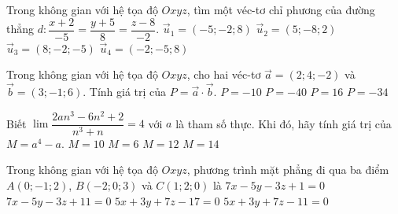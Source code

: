\begin{ex}%
	Trong không gian với hệ tọa độ $Oxyz$, tìm một véc-tơ chỉ phương của đường thẳng $d:\dfrac{x+2}{-5}=\dfrac{y+5}{8}=\dfrac{z-8}{-2}$. 
	\choice
	{$\overrightarrow{u}_1=(-5;-2;8)$}
	{\True $\overrightarrow{u}_2=(5;-8;2)$}
	{$\overrightarrow{u}_3=(8;-2;-5)$}
	{$\overrightarrow{u}_4=(-2;-5;8)$}
\end{ex}

\begin{ex}%
	Trong không gian với hệ tọa độ $Oxyz$, cho hai véc-tơ $\overrightarrow{a}=(2;4;-2)$ và $\overrightarrow{b}=(3;-1;6)$. Tính giá trị của $P=\overrightarrow{a}\cdot\overrightarrow{b}$. 
	\choice
	{\True $P=-10$}
	{$P=-40$}
	{$P=16$}
	{$P=-34$}
\end{ex}

\begin{ex}%
	Biết $\lim\dfrac{2an^3-6n^2+2}{n^3+n}=4$ với $a$ là tham số thực. Khi đó, hãy tính giá trị của $M=a^4-a$.
	\choice
	{$M=10$}
	{$M=6$}
	{$M=12$}
	{\True $M=14$}
\end{ex}

\begin{ex}%
	Trong không gian với hệ tọa độ $Oxyz$, phương trình mặt phẳng đi qua ba điểm $A(0;-1;2)$, $B(-2;0;3)$ và $C(1;2;0)$ là
	\choice
	{$7x-5y-3z+1=0$}
	{$7x-5y-3z+11=0$}
	{$5x+3y+7z-17=0$}
	{\True $5x+3y+7z-11=0$}
\end{ex}

